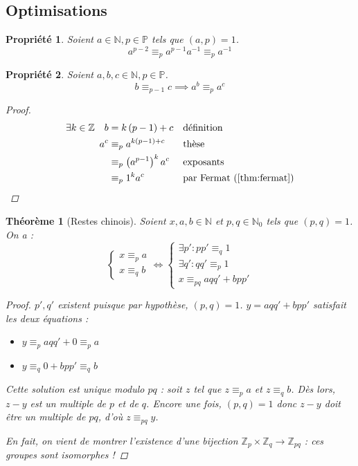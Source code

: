 \documentclass[11pt,twocolumn]{article}
\theoremstyle{plain}
\newtheorem{pr}{Propriété}
\newtheorem{thm}{Théorème}
\newcommand{\esP}{\mathbb{P}} %
\newcommand{\esN}{\mathbb{N}} %
\newcommand{\esZ}{\mathbb{Z}} %
\newcommand{\dbi}{\Longleftrightarrow}
\begin{document}
\subsection{Optimisations}
\begin{pr}
	Soient $a \in \esN, p \in \esP$ tels que $(a,p)=1$. \[
		a^{p-2} \equiv_p a^{p-1}a^{-1} \equiv_p a^{-1}
	\]
\end{pr}
\begin{pr}
	Soient $a,b,c \in \esN, p \in \esP$. \[
		b \equiv_{p-1} c
		\implies
		a^b \equiv_p a^c
	\]
	\begin{proof}
		\begin{align*}
			\exists k \in \esZ \quad b
			&= k\left(p-1\right)+c && \text{définition} \\
			a^c
			&\equiv_p a^{k\left(p-1\right)+c} && \text{thèse} \\
			&\equiv_p \left(a^{p-1}\right)^ka^c && \text{exposants} \\
			&\equiv_p 1^ka^c && \text{par Fermat (\ref{thm:fermat})}
		\end{align*}
	\end{proof}
\end{pr}
\begin{thm}[Restes chinois]\label{thm:chrem}
	Soient $x,a,b \in \esN$ et $p,q \in \esN_0$ tels que $(p,q)=1$. On a : \[
		\left\{\begin{array}{ll}
			x \equiv_p a \\
			x \equiv_q b
		\end{array}\right.
		\dbi
		\left\{\begin{array}{l}
			\exists p' : pp'\equiv_q1 \\
			\exists q' : qq'\equiv_p1 \\
			x \equiv_{pq} aqq'+bpp'
		\end{array}\right.
	\]
	\begin{proof}
		$p', q'$ existent puisque par hypothèse, $(p,q)=1$.
		$y=aqq'+bpp'$ satisfait les deux équations :
		\begin{itemize}
			\item $y \equiv_p aqq' + 0 \equiv_p a$
			\item $y \equiv_q 0 + bpp' \equiv_q b$
		\end{itemize}

		Cette solution est unique modulo $pq$ : soit $z$ tel que
		$z \equiv_p a$ et $z \equiv_q b$. Dès lors, $z-y$ est un multiple de $p$
		et de $q$. Encore une fois, $(p,q)=1$ donc $z-y$ doit être un multiple
		de $pq$, d'où $z \equiv_{pq} y$.

		En fait, on vient de montrer l'existence d'une bijection
		$\esZ_p \times \esZ_q \rightarrow \esZ_{pq}$ :
		ces groupes sont isomorphes !
	\end{proof}
\end{thm}
\end{document}
